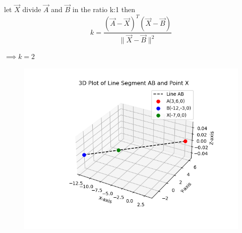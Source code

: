 \documentclass[journal]{IEEEtran}
\begin{document}
let $\vec{X}$ divide $\vec{A}$ and $\vec{B}$ in the ratio k:1 then \\
\begin{equation}
k = \frac{(\vec{A} - \vec{X})^T (\vec{X} - \vec{B})}{\|\vec{X} - \vec{B}\|^2}
\end{equation}

\begin{center}
$\implies k = 2$
\end{center}
\begin{figure}[H]
\begin{center}
\includegraphics[width=0.6\columnwidth]{Figs/Fig1.png}
\end{center}
\caption{}
\label{fig:Fig.1}
\end{figure}
\end{document}
